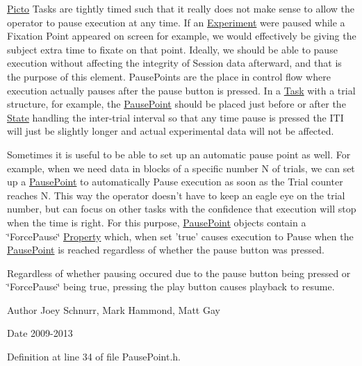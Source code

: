 \hyperlink{namespace_picto}{Picto} Tasks are tightly timed such that it really does not make sense to allow the operator to pause execution at any time. If an \hyperlink{class_picto_1_1_experiment}{Experiment} were paused while a Fixation Point appeared on screen for example, we would effectively be giving the subject extra time to fixate on that point. Ideally, we should be able to pause execution without affecting the integrity of Session data afterward, and that is the purpose of this element. Pause\-Points are the place in control flow where execution actually pauses after the pause button is pressed. In a \hyperlink{class_picto_1_1_task}{Task} with a trial structure, for example, the \hyperlink{class_picto_1_1_pause_point}{Pause\-Point} should be placed just before or after the \hyperlink{class_picto_1_1_state}{State} handling the inter-\/trial interval so that any time pause is pressed the I\-T\-I will just be slightly longer and actual experimental data will not be affected.

Sometimes it is useful to be able to set up an automatic pause point as well. For example, when we need data in blocks of a specific number N of trials, we can set up a \hyperlink{class_picto_1_1_pause_point}{Pause\-Point} to automatically Pause execution as soon as the Trial counter reaches N. This way the operator doesn't have to keep an eagle eye on the trial number, but can focus on other tasks with the confidence that execution will stop when the time is right. For this purpose, \hyperlink{class_picto_1_1_pause_point}{Pause\-Point} objects contain a \char`\"{}\-Force\-Pause\char`\"{} \hyperlink{class_picto_1_1_property}{Property} which, when set 'true' causes execution to Pause when the \hyperlink{class_picto_1_1_pause_point}{Pause\-Point} is reached regardless of whether the pause button was pressed.

Regardless of whether pausing occured due to the pause button being pressed or \char`\"{}\-Force\-Pause\char`\"{} being true, pressing the play button causes playback to resume. \begin{DoxyAuthor}{Author}
Joey Schnurr, Mark Hammond, Matt Gay 
\end{DoxyAuthor}
\begin{DoxyDate}{Date}
2009-\/2013 
\end{DoxyDate}


Definition at line 34 of file Pause\-Point.\-h.



